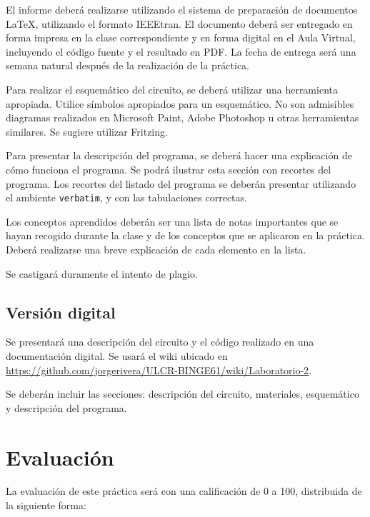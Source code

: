\documentclass[12pt,letterpaper]{IEEEtran}
\begin{document}
El informe deberá realizarse utilizando el sistema de preparación de documentos \LaTeX, utilizando el formato IEEEtran. El documento deberá ser entregado en forma impresa en la clase correspondiente y en forma digital en el Aula Virtual, incluyendo el código fuente y el resultado en PDF.  La fecha de entrega será una semana natural después de la realización de la práctica.


Para realizar el esquemático del circuito, se deberá utilizar una herramienta apropiada. Utilice símbolos apropiados para un esquemático. No son admisibles diagramas realizados en Microsoft Paint, Adobe Photoshop u otras herramientas similares. Se sugiere utilizar Fritzing.

Para presentar la descripción del programa, se deberá hacer una explicación de cómo funciona el programa. Se podrá ilustrar esta sección con recortes del programa. Los recortes del listado del programa se deberán presentar utilizando el ambiente \texttt{verbatim}, y con las tabulaciones correctas. 

Los conceptos aprendidos deberán ser una lista de notas importantes que se hayan recogido durante la clase y de los conceptos que se aplicaron en la práctica. Deberá realizarse una breve explicación de cada elemento en la lista.

Se castigará duramente el intento de plagio.

\subsection{Versión digital}

Se presentará una descripción del circuito y el código realizado en una documentación digital. Se usará el wiki ubicado en \url{https://github.com/jorgerivera/ULCR-BINGE61/wiki/Laboratorio-2}. 

Se deberán incluir las secciones: descripción del circuito, materiales, esquemático y descripción del programa.

\section{Evaluación}

La evaluación de este práctica será con una calificación de 0 a 100, distribuida de la siguiente forma:
\end{document}
